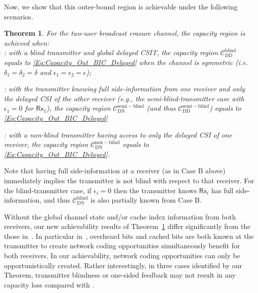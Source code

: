 \documentclass[journal,12pt,draftcls,onecolumn]{IEEEtran}
\newtheorem{theorem}{Theorem}
\newcommand{\msf}{\mathsf}
\begin{document}
\noindent
Now, we show that this outer-bound region is achievable under the following scenarios.

\begin{theorem}
\label{THM:Capacity_Out_BIC_Delayed}
For the two-user broadcast erasure channel, the capacity region is achieved when:\\
: with a blind transmitter and global delayed CSIT, the capacity region $\mathcal{C}^{\mathrm{blind}}_{\mathrm{DD}}$ equals to \eqref{Eq:Capacity_Out_BIC_Delayed} when the channel is symmetric (\emph{i.e.} $\delta_1 = \delta_2 = \delta$ and $\epsilon_1 = \epsilon_2 = \epsilon$);

: with the transmitter knowing full side-information from one receiver and
only the delayed CSI of the other receiver (e.g., the semi-blind-transmitter case with $\epsilon_1 = 0$ for $\msf{Rx}_1$), the capacity region $\mathcal{C}^{\mathrm{semi-blind}}_{\mathrm{DN}}$ (and thus $\mathcal{C}^{\mathrm{semi-blind}}_{\mathrm{DD}}$) equals to \eqref{Eq:Capacity_Out_BIC_Delayed}

: with a non-blind transmitter having access to only the delayed CSI of one receiver, the capacity region $\mathcal{C}^{\mathrm{non-blind}}_{\mathrm{DN}}$ equals to \eqref{Eq:Capacity_Out_BIC_Delayed}.

\end{theorem}
\noindent Note that having full side-information at a receiver (as in Case B above) immediately implies the transmitter is not blind with respect to that receiver. For the blind-transmitter case, if $\epsilon_i = 0$ then the transmitter knows $\msf{Rx}_i$ has full side-information, and thus $\mathcal{C}^{\mathrm{blind}}_{\mathrm{DN}}$ is also partially known from Case B.

Without the global channel state and/or cache index information from both receivers, our new achievability results of Theorem~\ref{THM:Capacity_Out_BIC_Delayed} differ significantly from the those in~\cite{ghorbel2016content}. In particular in~\cite{ghorbel2016content}, overheard bits and cached bits are both known at the transmitter to create network coding opportunities simultaneously benefit for both receivers. In our achievability, network coding opportunities can only be opportunistically created. Rather interestingly, in three cases identified by our Theorem, transmitter blindness or one-sided feedback may not result in any capacity loss compared with \cite{ghorbel2016content}. %
\end{document}
